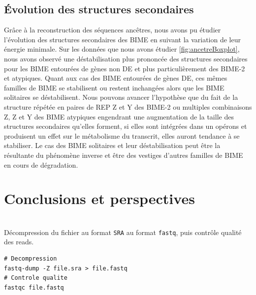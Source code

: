 \documentclass[12pt,a4paper]{report}
\begin{document}
\begin{onehalfspace}
\section*{Évolution des structures secondaires}
Grâce à la reconstruction des séquences ancêtres, nous avons pu étudier l'évolution des structures secondaires des BIME en suivant la variation de leur énergie minimale. Sur les données que nous avons étudier \autoref{fig:ancetreBoxplot}, nous avons observé une déstabilisation plus prononcée des structures secondaires pour les BIME entourées de gènes non DE et plus particulièrement des BIME-2 et atypiques. Quant aux cas des BIME entourées de gènes DE, ces mêmes familles de BIME se stabilisent ou restent inchangées alors que les BIME solitaires se déstabilisent. Nous pouvons avancer l'hypothèse que du fait de la structure répétée en paires de REP Z et Y des BIME-2 ou multiples combinaisons Z, Z et Y des BIME atypiques engendrant une augmentation de la taille des structures secondaires qu'elles forment, si elles sont intégrées dans un opérons et produisent un effet sur le métabolisme du transcrit, elles auront tendance à se stabiliser. Le cas des BIME solitaires et leur déstabilisation peut être la résultante du phénomène inverse et être des vestiges d'autres familles de BIME en cours de dégradation.

\chapter*{Conclusions et perspectives}

\end{onehalfspace}


\renewcommand{\thepage}{}
\printglossary[type=\acronymtype ,title=Glossaire]

%


\appendix

\chapter{}
\label{annexeCode}

Décompression du fichier au format \texttt{SRA} au format \texttt{fastq}, puis contrôle qualité des reads.
\begin{lstlisting}[frame=single]
# Decompression
fastq-dump -Z file.sra > file.fastq
# Controle qualite
fastqc file.fastq
\end{lstlisting}
\end{document}
